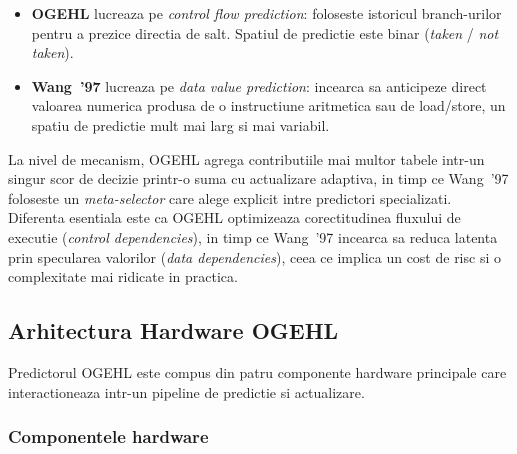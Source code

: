 \begin{itemize}
    \item \textbf{OGEHL} lucreaza pe \textit{control flow prediction}:
          foloseste istoricul branch-urilor pentru a prezice directia de salt.
          Spatiul de predictie este binar (\textit{taken} / \textit{not taken}).
    \item \textbf{Wang~'97} lucreaza pe \textit{data value prediction}:
          incearca sa anticipeze direct valoarea numerica produsa de o
          instructiune aritmetica sau de load/store, un spatiu de predictie
          mult mai larg si mai variabil.
\end{itemize}

La nivel de mecanism, OGEHL agrega contributiile mai multor tabele intr-un
singur scor de decizie printr-o suma cu actualizare adaptiva, in timp ce
Wang~'97 foloseste un \textit{meta-selector} care alege explicit intre
predictori specializati. Diferenta esentiala este ca OGEHL optimizeaza
corectitudinea fluxului de executie (\textit{control dependencies}), in timp
ce Wang~'97 incearca sa reduca latenta prin specularea valorilor
(\textit{data dependencies}), ceea ce implica un cost de risc si o
complexitate mai ridicate in practica.

\subsection{Arhitectura Hardware OGEHL}
\label{sec:hw}

Predictorul OGEHL este compus din patru componente hardware principale care
interactioneaza intr-un pipeline de predictie si actualizare.

\subsubsection*{Componentele hardware}


